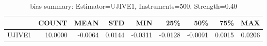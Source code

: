 \begin{table}[ht]
\centering
\caption{bias summary: Estimator=UJIVE1, Instruments=500, Strength=0.40}
\begin{tabular}{lrrrrrrrr}
\toprule
 & COUNT & MEAN & STD & MIN & 25\% & 50\% & 75\% & MAX \\
\midrule
UJIVE1 & 10.0000 & -0.0064 & 0.0144 & -0.0311 & -0.0128 & -0.0091 & 0.0015 & 0.0206 \\
\bottomrule
\end{tabular}
\end{table}
